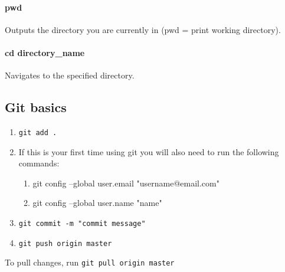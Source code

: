 \documentclass[11pt]{article}
\begin{document}
\paragraph{pwd} Outputs the directory you are currently in (pwd = print working directory).
\paragraph{cd directory\_name} Navigates to the specified directory. 
\subsection{Git basics}
\begin{enumerate}
\item \lstinline{git add .}
\item If this is your first time using git you will also need to run the following commands:
\begin{enumerate}
\item git config --global user.email "username@email.com"
\item git config --global user.name "name"
\end{enumerate}
\item \lstinline{git commit -m "commit message"}
\item \lstinline{git push origin master}
\end{enumerate}
To pull changes, run \lstinline{git pull origin master}
\end{document}
